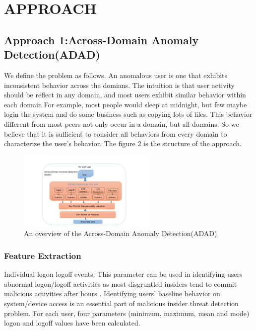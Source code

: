 \documentclass[conference]{IEEEtran}
\begin{document}
\section{APPROACH}


\subsection{Approach 1:Across-Domain Anomaly Detection(ADAD)}\label{AA}

We define the problem as follows. An anomalous user is one that exhibits inconsistent behavior across the domians. The intuition is that user activity should be reflect in any domain, and most users exhibit similar behavior within each domain.For example, most people would sleep at midnight, but few maybe login the system and do some business such as copying lots of files. This behavior different from most peers not only occur in a domain, but all domains. So  we believe that it is sufficient to consider all behaviors from every domain to characterize the user's behavior. The figure 2 is the structure of the approach.

\begin{figure}[htb]
\centerline{\includegraphics[width = 0.6\textwidth]{figure/figure3.png}}
\caption{An overview of the Across-Domain Anomaly Detection(ADAD).}
\label{fig}
\end{figure}

\subsubsection{Feature Extraction}

Individual logon logoff events. This parameter can be used in identifying users abnormal logon/logoff activities as most disgruntled insiders tend to commit malicious activities after hours \cite{b40}. Identifying users’ baseline behavior on system/device access is an essential part of malicious insider threat detection problem. For each user, four parameters (minimum, maximum, mean and mode) logon and logoff values have been calculated. 
\end{document}
